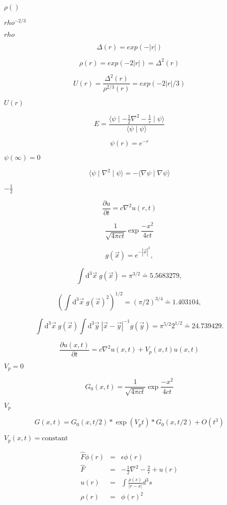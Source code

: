 \documentclass{article}
\begin{document}
$ \rho() $
\pagebreak

$ rho^{-2/3} $
\pagebreak

$ rho $
\pagebreak

\[
\Delta(r) = exp(- | r | )
\]
\pagebreak

\[
\rho(r) = exp(- 2 | r | ) = \Delta^2(r)
\]
\pagebreak

\[
U(r) = \frac{\Delta^2 (r)}{\rho^{2/3} (r)} = exp( - 2 | r | / 3)
\]
\pagebreak

$
U(r) $
\pagebreak

\[
    E = \frac{\langle \psi \mid - \frac{1}{2}  \nabla^2  - \frac{1}{r} \mid \psi \rangle}{\langle \psi \mid \psi \rangle}
\]
\pagebreak

\[
   \psi(r) = e^{-r}
\]
\pagebreak

$ \psi(\infty)=0 $
\pagebreak

\[
     \langle \psi \mid \nabla^2 \mid \psi \rangle = - \langle \nabla \psi \mid \nabla \psi \rangle
\]
\pagebreak

$-\frac{1}{2}$
\pagebreak

\[
\frac{\partial u}{\partial t} = c \nabla^2 u(r,t)
\]
\pagebreak

\[
\frac{1}{\sqrt{4 \pi c t}}  \exp \frac{-x^2}{4 c t}
\]
\pagebreak

\[ g(\vec{x}) = e^{-|\vec{x}|^2}, \]
\pagebreak

\[
   \int \mathrm{d}^3 \vec{x} \; g(\vec{x}) = \pi^{3/2} \doteq 5.5683279,
\]
\pagebreak

\[
   \left( \int \mathrm{d}^3 \vec{x} \; g(\vec{x})^2 \right)^{1/2} = (\pi/2)^{3/4} \doteq 1.403104,
\]
\pagebreak

\[
   \int \mathrm{d}^3 \vec{x} \; g(\vec{x}) \int \mathrm{d}^3 \vec{y} \; |\vec{x}-\vec{y}|^{-1} g(\vec{y}) = \pi^{5/2} 2^{1/2} \doteq 24.739429.
\]
\pagebreak

\[
  \frac{\partial u(x,t)}{\partial t} = c \nabla^2 u(x,t) + V_p(x,t) u(x,t)
\]
\pagebreak

$ V_p = 0 $
\pagebreak

\[
  G_0(x,t) = \frac{1}{\sqrt{4 \pi c t}} \exp \frac{-x^2}{4 c t}
\]
\pagebreak

$ V_p $
\pagebreak

\[
  G(x,t) = G_0(x,t/2) * \exp(V_p t) * G_0(x,t/2) + O(t^3)
\]
\pagebreak

$ V_p(x,t)=\mbox{constant} $
\pagebreak

\begin{eqnarray*}
   \hat{F} \phi(r) &=& \epsilon \phi(r) \\
   \hat{F} &=& -\frac{1}{2} \nabla^2 - \frac{2}{r} + u(r) \\
   u(r) &=& \int \frac{\rho(s)}{| r - s |} d^3s \\
   \rho(r) &=& \phi(r)^2
\end{eqnarray*}
\pagebreak
\end{document}
